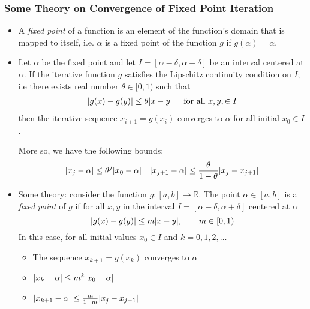 \documentclass[11pt, a4paper]{article}
\newcommand{\R}{\mathbb{R}} %
\begin{document}
\subsubsection{Some Theory on Convergence of Fixed Point Iteration}
\begin{itemize}
	\item A \textit{fixed point} of a function is an element of the function's domain that is mapped to itself, i.e. $ \alpha $ is a fixed point of the function $ g $ if $ g(\alpha) = \alpha $.
	
	\item Let $ \alpha $ be the fixed point and let $ I = [\alpha - \delta, \alpha + \delta ] $ be an interval centered at $ \alpha $. If the iterative function $ g $ satisfies the Lipschitz continuity condition on $ I $; i.e there exists real number $ \theta \in [0, 1) $ such that 
	\begin{align*}
		\abs{g(x) - g(y)} \leq \theta \abs{x - y} \quad \text{ for all } x, y, \in I
	\end{align*}
	then the iterative sequence $ x_{i + 1} = g(x_i) $ converges to $ \alpha $ for all initial $ x_0 \in I $.
	
	More so, we have the following bounds:
	\begin{align*}
		\abs{x_{j} - \alpha} \leq \theta^{j}\abs{x_0 - \alpha} && \abs{x_{j+1} - \alpha} \leq \frac{\theta}{1 - \theta} \abs{x_{j} - x_{j+1}}
	\end{align*}
	
	
	
	\item Some theory: consider the function $ g : [a, b] \to \R $. The point $ \alpha \in [a, b] $ is a \textit{fixed point} of $ g $ if for all $ x, y $ in the interval $ I = [\alpha - \delta, \alpha + \delta] $ centered at $ \alpha $
	\begin{equation*}
		\abs{g(x) - g(y)} \leq m \abs{x - y}, \qquad m \in [0, 1)
	\end{equation*}
	In this case, for all initial values $ x_{0} \in I $ and $ k = 0, 1, 2, \ldots $
	\begin{itemize}
		\item The sequence $ x_{k + 1} = g(x_{k}) $ converges to $ \alpha $ 
		\item $ \abs{x_{k} - \alpha} \leq m^{k} \abs{x_{0} - \alpha} $
		\item $ \abs{x_{k+1} - \alpha} \leq \frac{m}{1-m}\abs{x_{j} - x_{j-1}} $
	\end{itemize}
	

\end{itemize}
\end{document}
